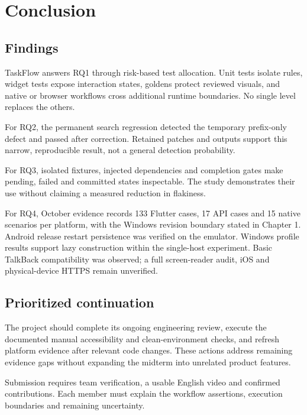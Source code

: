\documentclass[12pt,a4paper,oneside]{report}
\begin{document}
\chapter{Conclusion}
\section{Findings}
TaskFlow answers RQ1 through risk-based test allocation. Unit tests isolate rules, widget tests expose interaction states, goldens protect reviewed visuals, and native or browser workflows cross additional runtime boundaries. No single level replaces the others.

For RQ2, the permanent search regression detected the temporary prefix-only defect and passed after correction. Retained patches and outputs support this narrow, reproducible result, not a general detection probability.

For RQ3, isolated fixtures, injected dependencies and completion gates make pending, failed and committed states inspectable. The study demonstrates their use without claiming a measured reduction in flakiness.

For RQ4, October evidence records 133 Flutter cases, 17 API cases and 15 native scenarios per platform, with the Windows revision boundary stated in Chapter 1. Android release restart persistence was verified on the emulator. Windows profile results support lazy construction within the single-host experiment. Basic TalkBack compatibility was observed; a full screen-reader audit, iOS and physical-device HTTPS remain unverified.

\section{Prioritized continuation}
The project should complete its ongoing engineering review, execute the documented manual accessibility and clean-environment checks, and refresh platform evidence after relevant code changes. These actions address remaining evidence gaps without expanding the midterm into unrelated product features.

Submission requires team verification, a usable English video and confirmed contributions. Each member must explain the workflow assertions, execution boundaries and remaining uncertainty.
\end{document}
